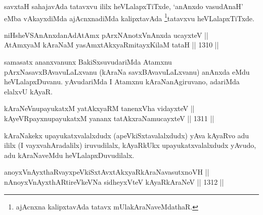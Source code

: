 \begin{artha}
savxtaH sahajavAda tatavxvu ililx heVLalapxTiTxde, `anAnxdo vasudAnaH' eMba vAkayxdiMda ajAcnxnadiMda kalipxtavAda \footnote{ajAcnxna kalipxtavAda tatavx mUlakAraNaveMdathaR.}tatavxvu heVLalapxTiTxde.
\end{artha}


\begin{shl}
\footnotemark[3]niHsheVSAnAnxdanAdAtAmx pArxNAnotxV\s nAnxda ucayxteV || \\
AtAmx\s yaM kAraNaM yasAmxtAkxyaRmitayxKilaM tataH \hfill || 1310 ||  
\end{shl}

\begin{artha}
samasatx ananxvanunx BakiSxsuvudariMda Atamxnu pArxNasavxBAvavuLaLxvanu (kAraNa savxBAvavuLaLxvanu) anAnxda eMdu heVLalapxDuvanu. yAvudariMda I Atamxnu kAraNanAgiruvano, adariMda elalxvU kAyaR.
\end{artha}

\begin{shl}
kAraNeV\s nupayukatxM yatAkxyaRM tanenxVha vidayxteV || \\
kAyeVR\s payxnupayukatxM yananx tatAkxraNamucayxteV \hfill || 1311 ||  
\end{shl}

\begin{artha}
kAraNakekx upayukatxvalalxdudx (apeVkiSxtavalalxdudx) yAva kAyaRvo adu ililx (I vayxvahAradalilx) iruvudilalx, kAyaRkUkx upayukatxvalalxdudx yAvudo, adu kAraNaveMdu heVLalapxDuvudilalx.
\end{artha}


\begin{shl}
anoyxVnAyxthaRvayxpeVkiSxtAvxtAkxyaRkAraNavasutxnoVH || \\
nAnoyxVnAyxthARtireVkeVNa sidheyxVteV kAyaRkAraNeV \hfill || 1312 ||  
\end{shl}

